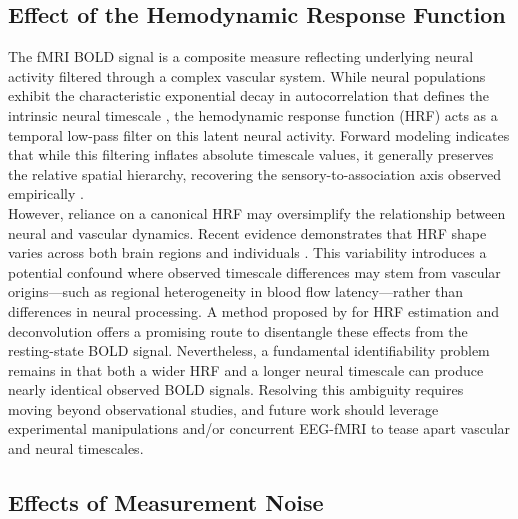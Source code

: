 \documentclass[9pt]{article}
\begin{document}
\subsection{Effect of the Hemodynamic Response Function}\label{sec:hrf}

The fMRI BOLD signal is a composite measure reflecting underlying neural activity filtered through a complex vascular system. While neural populations exhibit the characteristic exponential decay in autocorrelation that defines the intrinsic neural timescale \citep[Supplementary Mathematical Note]{murray_hierarchy_2014}, the hemodynamic response function (HRF) acts as a temporal low-pass filter on this latent neural activity. Forward modeling indicates that while this filtering inflates absolute timescale values, it generally preserves the relative spatial hierarchy, recovering the sensory-to-association axis observed empirically \citep{watanabe_atypical_2019}.\\

However, reliance on a canonical HRF may oversimplify the relationship between neural and vascular dynamics. Recent evidence demonstrates that HRF shape varies across both brain regions and individuals \citep{bailes_resting-state_2023, rangaprakash_hemodynamic_2018}. This variability introduces a potential confound where observed timescale differences may stem from vascular origins—such as regional heterogeneity in blood flow latency—rather than differences in neural processing. A method proposed by \citet{wu_rshrf_2021} for HRF estimation and deconvolution offers a promising route to disentangle these effects from the resting-state BOLD signal. Nevertheless, a fundamental identifiability problem remains in that both a wider HRF and a longer neural timescale can produce nearly identical observed BOLD signals. Resolving this ambiguity requires moving beyond observational studies, and future work should leverage experimental manipulations and/or concurrent EEG-fMRI to tease apart vascular and neural timescales.

\subsection{Effects of Measurement Noise}\label{sec:measurement-noise}
\end{document}
